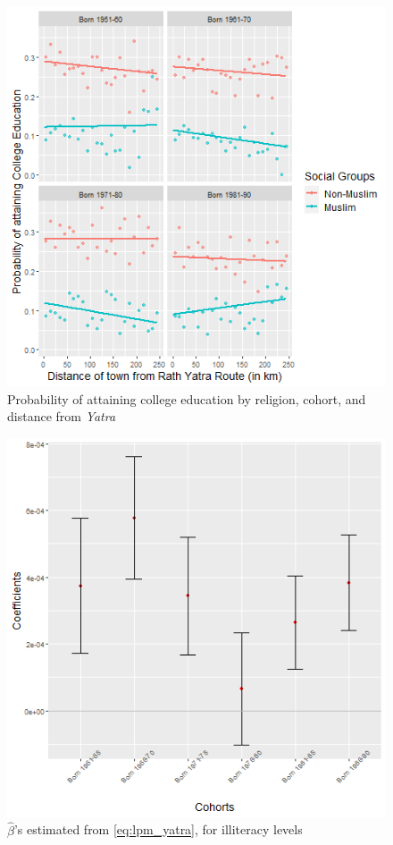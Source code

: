 \documentclass{article}
\begin{document}
\begin{figure}[H]
    \centering
    \includegraphics[scale = 0.7]{images/graph_li_col_mus.png}
    \caption{Probability of attaining college education by religion, cohort, and distance from \textit{Yatra}}
    \label{fig:li_col_mus}
\end{figure}

\begin{figure}[H]
    \centering
    \includegraphics[scale = 0.5]{images/graph_coeff_ill.png}
    \caption{$\hat{\beta}$'s estimated from \eqref{eq:lpm_yatra}, for illiteracy levels}
    \label{fig:coeff_ill}
\end{figure}
\end{document}

